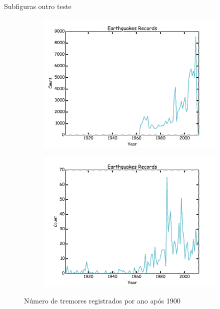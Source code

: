 \documentclass[ucs,8pt]{beamer}
\begin{document}
\begin{frame}{Subfiguras outro teste}
\begin{figure}
	\centering
	\begin{subfigure}[b]{0.48\textheight}
		  	\centering
			\includegraphics[height=1.00\textheight]{hmtk_sa3_rate}
			\label{fig:sa_eq_record}
	\end{subfigure}%
	\quad %
	\begin{subfigure}[b]{0.48\textheight}
		  	\centering
			\includegraphics[height=1.00\textheight]{hmtk_bsb2013_rate}
			\label{fig:br_eq_record}
    \end{subfigure}
	\caption{Número de tremores registrados por ano após 1900}
	\label{fig:eq_record}
\end{figure}
\end{frame}
\end{document}
